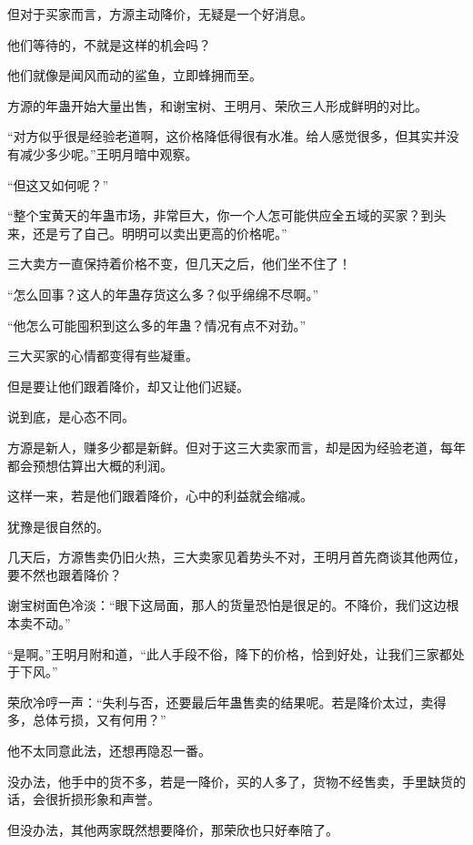 \begin{this_body}
但对于买家而言，方源主动降价，无疑是一个好消息。

他们等待的，不就是这样的机会吗？

他们就像是闻风而动的鲨鱼，立即蜂拥而至。

方源的年蛊开始大量出售，和谢宝树、王明月、荣欣三人形成鲜明的对比。

“对方似乎很是经验老道啊，这价格降低得很有水准。给人感觉很多，但其实并没有减少多少呢。”王明月暗中观察。

“但这又如何呢？”

“整个宝黄天的年蛊市场，非常巨大，你一个人怎可能供应全五域的买家？到头来，还是亏了自己。明明可以卖出更高的价格呢。”

三大卖方一直保持着价格不变，但几天之后，他们坐不住了！

“怎么回事？这人的年蛊存货这么多？似乎绵绵不尽啊。”

“他怎么可能囤积到这么多的年蛊？情况有点不对劲。”

三大买家的心情都变得有些凝重。

但是要让他们跟着降价，却又让他们迟疑。

说到底，是心态不同。

方源是新人，赚多少都是新鲜。但对于这三大卖家而言，却是因为经验老道，每年都会预想估算出大概的利润。

这样一来，若是他们跟着降价，心中的利益就会缩减。

犹豫是很自然的。

几天后，方源售卖仍旧火热，三大卖家见着势头不对，王明月首先商谈其他两位，要不然也跟着降价？

谢宝树面色冷淡：“眼下这局面，那人的货量恐怕是很足的。不降价，我们这边根本卖不动。”

“是啊。”王明月附和道，“此人手段不俗，降下的价格，恰到好处，让我们三家都处于下风。”

荣欣冷哼一声：“失利与否，还要最后年蛊售卖的结果呢。若是降价太过，卖得多，总体亏损，又有何用？”

他不太同意此法，还想再隐忍一番。

没办法，他手中的货不多，若是一降价，买的人多了，货物不经售卖，手里缺货的话，会很折损形象和声誉。

但没办法，其他两家既然想要降价，那荣欣也只好奉陪了。

\end{this_body}

